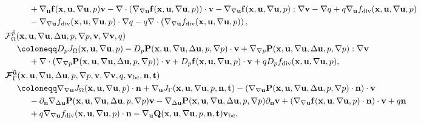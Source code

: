 \documentclass[oneside,11pt]{book}
\numberwithin{equation}{section}
\begin{document}
\begin{itemize}[leftmargin=0in]
\begin{align*}
        &\hspace{1cm}+ \nabla_{\bf u}{\bf f}({\bf x},{\bf u},\nabla{\bf u},p){\bf v} - \nabla\cdot\left(\nabla_{\nabla{\bf u}}{\bf f}({\bf x},{\bf u},\nabla{\bf u},p)\right)\cdot{\bf v} - \nabla_{\nabla{\bf u}}{\bf f}({\bf x},{\bf u},\nabla{\bf u},p):\nabla{\bf v} - \nabla q + q\nabla_{\bf u}f_{\rm div}({\bf x},{\bf u},\nabla{\bf u},p)\\
        &\hspace{1cm}- \nabla_{\nabla{\bf u}}f_{\rm div}({\bf x},{\bf u},\nabla{\bf u},p)\cdot\nabla q - q\nabla\cdot\left(\nabla_{\nabla{\bf u}}f_{\rm div}({\bf x},{\bf u},\nabla{\bf u},p)\right),\\
        &\mathcal{F}_\Omega^{\tilde{p}}({\bf x},{\bf u},\nabla{\bf u},\Delta{\bf u},p,\nabla p,{\bf v},\nabla{\bf v},q)\\
        &\hspace{5mm}\coloneqq D_pJ_\Omega({\bf x},{\bf u},\nabla{\bf u},p) - D_p{\bf P}({\bf x},{\bf u},\nabla{\bf u},\Delta{\bf u},p,\nabla p)\cdot{\bf v} + \nabla_{\nabla p}{\bf P}({\bf x},{\bf u},\nabla{\bf u},\Delta{\bf u},p,\nabla p):\nabla{\bf v}\\
        &\hspace{1cm} + \nabla\cdot\left(\nabla_{\nabla p}{\bf P}({\bf x},{\bf u},\nabla{\bf u},\Delta{\bf u},p,\nabla p)\right)\cdot{\bf v} + D_p{\bf f}({\bf x},{\bf u},\nabla{\bf u},p)\cdot{\bf v} + qD_pf_{\rm div}({\bf x},{\bf u},\nabla{\bf u},p),\\
        &\boldsymbol{\mathcal{F}}_\Gamma^{\tilde{\bf u}}({\bf x},{\bf u},\nabla{\bf u},\Delta{\bf u},p,\nabla p,{\bf v},\nabla{\bf v},q,{\bf v}_{\rm bc},{\bf n},{\bf t})\\
        &\hspace{5mm}\coloneqq\nabla_{\nabla{\bf u}}J_\Omega({\bf x},{\bf u},\nabla{\bf u},p)\cdot{\bf n} + \nabla_{\bf u}J_\Gamma({\bf x},{\bf u},\nabla{\bf u},p,{\bf n},{\bf t}) - \left(\nabla_{\nabla{\bf u}}{\bf P}({\bf x},{\bf u},\nabla{\bf u},\Delta{\bf u},p,\nabla p)\cdot{\bf n}\right)\cdot{\bf v}\\
        &\hspace{1cm} - \partial_{\bf n}\nabla_{\Delta{\bf u}}{\bf P}({\bf x},{\bf u},\nabla{\bf u},\Delta{\bf u},p,\nabla p){\bf v} - \nabla_{\Delta{\bf u}}{\bf P}({\bf x},{\bf u},\nabla{\bf u},\Delta{\bf u},p,\nabla p)\partial_{\bf n}{\bf v} + \left(\nabla_{\nabla{\bf u}}{\bf f}({\bf x},{\bf u},\nabla{\bf u},p)\cdot{\bf n}\right)\cdot{\bf v} + q{\bf n}\\
        &\hspace{1cm} + q\nabla_{\nabla{\bf u}}f_{\rm div}({\bf x},{\bf u},\nabla{\bf u},p)\cdot{\bf n} - \nabla_{\bf u}{\bf Q}({\bf x},{\bf u},\nabla{\bf u},p,{\bf n},{\bf t}){\bf v}_{\rm bc},\\

\end{align*}
\end{itemize}
\end{document}

